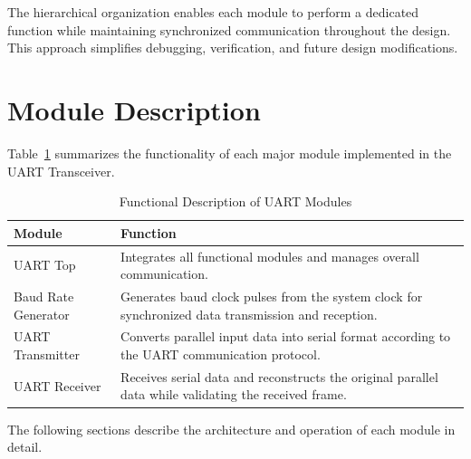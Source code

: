 The hierarchical organization enables each module to perform a dedicated function while maintaining synchronized communication throughout the design. This approach simplifies debugging, verification, and future design modifications.


\section{Module Description}

Table~\ref{tab:uart_modules} summarizes the functionality of each major module implemented in the UART Transceiver.

\begin{table}[!htbp]
\centering
\caption{Functional Description of UART Modules}
\label{tab:uart_modules}

\renewcommand{\arraystretch}{1.3}

\begin{tabular}{|p{4cm}|p{9cm}|}

\hline

\textbf{Module} & \textbf{Function} \\

\hline

UART Top &
Integrates all functional modules and manages overall communication. \\

\hline

Baud Rate Generator &
Generates baud clock pulses from the system clock for synchronized data transmission and reception. \\

\hline

UART Transmitter &
Converts parallel input data into serial format according to the UART communication protocol. \\

\hline

UART Receiver &
Receives serial data and reconstructs the original parallel data while validating the received frame. \\

\hline

\end{tabular}

\end{table}

The following sections describe the architecture and operation of each module in detail.

